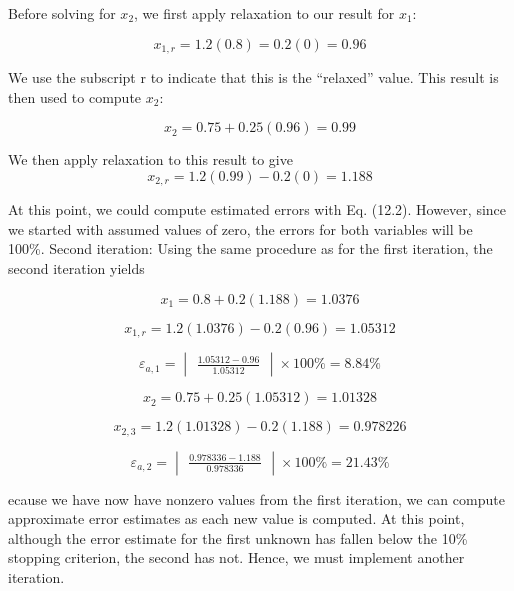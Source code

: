 \documentclass[../main.tex]{subfiles}
\begin{document}
Before solving for $x_{2}$, we first apply relaxation to our result for $x_{1}$:

\begin{equation}
x_{1,r}=1.2(0.8)=0.2(0)=0.96
\end{equation}

We use the subscript r to indicate that this is the “relaxed” value. This result is then used to
compute $x_{2}$:

\begin{equation}
x_{2}=0.75+0.25(0.96)=0.99
\end{equation}

We then apply relaxation to this result to give
\begin{equation}
x_{2,r}=1.2(0.99)-0.2(0)=1.188
\end{equation}

At this point, we could compute estimated errors with Eq. (12.2). However, since we
started with assumed values of zero, the errors for both variables will be 100\%.
Second iteration: Using the same procedure as for the first iteration, the second iteration
yields

\begin{equation}
x_{1}=0.8+0.2(1.188)=1.0376
\end{equation}

\begin{equation}
x_{1,r}=1.2(1.0376)-0.2(0.96)=1.05312
\end{equation}

\begin{equation}
\varepsilon _{a,1}=\begin{vmatrix}
\frac{1.05312-0.96}{1.05312}
\end{vmatrix}
\times 100\%=8.84\%
\end{equation}

\begin{equation}
x_{2}=0.75+0.25(1.05312)=1.01328
\end{equation}

\begin{equation}
x_{2,3}=1.2(1.01328)-0.2(1.188)=0.978226
\end{equation}

\begin{equation}
\varepsilon _{a,2}=\begin{vmatrix}
\frac{0.978336-1.188}{0.978336}
\end{vmatrix}
\times 100\%=21.43\%
\end{equation}

ecause we have now have nonzero values from the first iteration, we can compute approximate error estimates as each new value is computed. At this point, although the error
estimate for the first unknown has fallen below the 10\% stopping criterion, the second has
not. Hence, we must implement another iteration.
\end{document}
